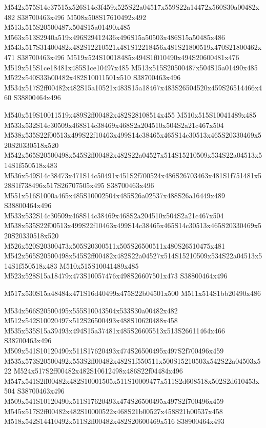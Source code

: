 \documentclass{article}
\begin{document}
\begin{multicols}{2}
M542x575S14c37515x526S14c3f459x525S22a04517x559S22a14472x560S30a00482x482 S38700463x496 M508x508S17610492x492 M513x515S20500487x504S15a01490x485 M563x513S2940a519x496S29412436x496S15a50503x486S15a50485x486 M543x517S31400482x482S12210521x481S12218456x481S21800519x470S21800462x471 S38700463x496 M519x524S10018485x494S1f010490x494S20600481x476 M519x515S1ce18481x485S1ce10497x485 M513x515S20500487x504S15a01490x485 M522x540S33b00482x482S10011501x510 S38700463x496 M534x517S2ff00482x482S15a10521x483S15a18467x483S26504520x459S26514466x460 S38800464x496


M540x519S10011519x489S2ff00482x482S28108514x455 M510x515S10041489x485 M533x532S14c30509x468S14c38469x468S2a204510x504S2a21c467x504 M538x535S22f00513x499S22f10463x499S14c38465x465S14c30513x465S20330469x520S20330518x520 M542x565S20500498x545S2ff00482x482S22a04527x514S15210509x534S22a04513x514S1f550518x483 M536x549S14c38473x471S14c50491x451S2f700524x486S26703463x481S1f751481x528S1f738496x517S26707505x495 S38700463x496 M551x516S1000a465x485S10002504x485S26a02537x488S26a16449x489 S38800464x496 M533x532S14c30509x468S14c38469x468S2a204510x504S2a21c467x504 M538x535S22f00513x499S22f10463x499S14c38465x465S14c30513x465S20330469x520S20330518x520 M526x520S20300473x505S20300511x505S26500511x480S26510475x481 M542x565S20500498x545S2ff00482x482S22a04527x514S15210509x534S22a04513x514S1f550518x483 M510x515S10041489x485 M523x528S15a18479x473S10057476x498S26607501x473 S38800464x496


\begin{center}
M517x530S15a48484x471S16d40499x475S22b04501x500 M511x514S1bb20490x486 
\end{center}


M534x566S20500495x555S10043504x533S30a00482x482 M512x542S10020497x512S26500493x488S10620488x458 M535x535S15a39493x494S15a37481x485S26605513x513S26611464x466 S38700463x496 M509x541S10120490x511S17620493x474S26500495x497S2f700496x459 M535x573S20500492x553S2ff00482x482S1f550511x500S15210503x542S22a04503x522 M524x517S2ff00482x482S10612498x486S22f04484x496 M547x541S2ff00482x482S10001505x511S10009477x511S2d608518x502S2d610453x504 S38700463x496 M509x541S10120490x511S17620493x474S26500495x497S2f700496x459 M545x517S2ff00482x482S10000522x468S21b00527x458S21b00537x458 M518x542S14410492x511S2ff00482x482S20600469x516 S38900464x493


\end{multicols}
\end{document}
